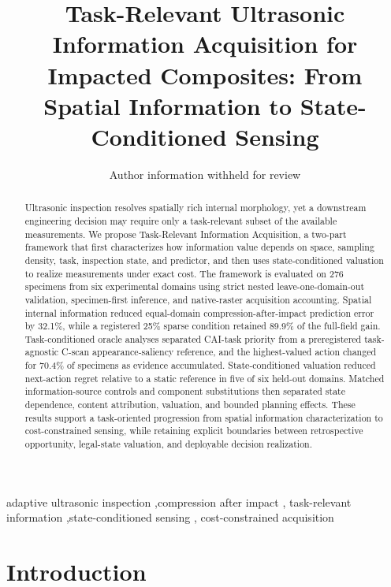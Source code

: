 \documentclass[preprint,12pt]{elsarticle}
\begin{document}
\begin{frontmatter}

\title{Task-Relevant Ultrasonic Information Acquisition for Impacted Composites: From Spatial Information to State-Conditioned Sensing}

\author{Author information withheld for review}
\address{Author affiliation withheld for review}

\begin{abstract}
Ultrasonic inspection resolves spatially rich internal morphology, yet a
downstream engineering decision may require only a task-relevant subset of the
available measurements. We propose Task-Relevant Information Acquisition, a
two-part framework that first characterizes how information value depends on
space, sampling density, task, inspection state, and predictor, and then uses
state-conditioned valuation to realize measurements under exact cost. The
framework is evaluated on 276 specimens from six experimental domains using
strict nested leave-one-domain-out validation, specimen-first inference, and
native-raster acquisition accounting. Spatial internal information reduced
equal-domain compression-after-impact prediction error by 32.1\%, while a
registered 25\% sparse condition retained 89.9\% of the full-field gain.
Task-conditioned oracle analyses separated CAI-task priority from a
preregistered task-agnostic C-scan appearance-saliency reference, and the
highest-valued action changed for 70.4\%
of specimens as evidence accumulated. State-conditioned valuation reduced
next-action regret relative to a static reference in five of six held-out
domains. Matched information-source controls and component substitutions then
separated state dependence, content attribution, valuation, and bounded
planning effects. These results support a task-oriented progression from
spatial information characterization to cost-constrained sensing, while
retaining explicit boundaries between retrospective opportunity, legal-state
valuation, and deployable decision realization.
\end{abstract}

\begin{keyword}
adaptive ultrasonic inspection \sep compression after impact \sep
task-relevant information \sep state-conditioned sensing \sep
cost-constrained acquisition
\end{keyword}

\end{frontmatter}

\section{Introduction}
\label{sec:introduction}
\end{document}
